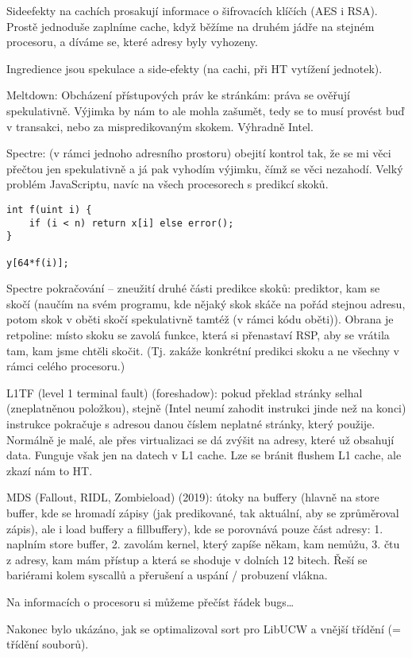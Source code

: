 \documentclass[12pt]{article}                   %
\begin{document}
        \begin{poznamka}
            Sideefekty na cachích prosakují informace o šifrovacích klíčích (AES i RSA). Prostě jednoduše zaplníme cache, když běžíme na druhém jádře na stejném procesoru, a díváme se, které adresy byly vyhozeny.

            Ingredience jsou spekulace a side-efekty (na cachi, při HT vytížení jednotek).

            Meltdown: Obcházení přístupových práv ke stránkám: práva se ověřují spekulativně. Výjimka by nám to ale mohla zašumět, tedy se to musí provést buď v transakci, nebo za mispredikovaným skokem. Výhradně Intel.


            Spectre: (v rámci jednoho adresního prostoru) obejití kontrol tak, že se mi věci přečtou jen spekulativně a já pak vyhodím výjimku, čímž se věci nezahodí. Velký problém JavaScriptu, navíc na všech procesorech s predikcí skoků.

            \begin{verbatim}
int f(uint i) {
    if (i < n) return x[i] else error();
}

y[64*f(i)];
            \end{verbatim}

            Spectre pokračování -- zneužití druhé části predikce skoků: prediktor, kam se skočí (naučím na svém programu, kde nějaký skok skáče na pořád stejnou adresu, potom skok v oběti skočí spekulativně tamtéž (v rámci kódu oběti)). Obrana je retpoline: místo skoku se zavolá funkce, která si přenastaví RSP, aby se vrátila tam, kam jsme chtěli skočit. (Tj. zakáže konkrétní predikci skoku a ne všechny v rámci celého procesoru.)

            L1TF (level 1 terminal fault) (foreshadow): pokud překlad stránky selhal (zneplatněnou položkou), stejně (Intel neumí zahodit instrukci jinde než na konci) instrukce pokračuje s adresou danou číslem neplatné stránky, který použije. Normálně je malé, ale přes virtualizaci se dá zvýšit na adresy, které už obsahují data. Funguje však jen na datech v L1 cache. Lze se bránit flushem L1 cache, ale zkazí nám to HT.

            MDS (Fallout, RIDL, Zombieload) (2019): útoky na buffery (hlavně na store buffer, kde se hromadí zápisy (jak predikované, tak aktuální, aby se zprůměroval zápis), ale i load buffery a fillbuffery), kde se porovnává pouze část adresy: 1. naplním store buffer, 2. zavolám kernel, který zapíše někam, kam nemůžu, 3. čtu z adresy, kam mám přístup a která se shoduje v dolních 12 bitech. Řeší se bariérami kolem syscallů a přerušení a uspání / probuzení vlákna.

            Na informacích o procesoru si můžeme přečíst řádek bugs…
        \end{poznamka}


        \begin{poznamka}
            Nakonec bylo ukázáno, jak se optimalizoval sort pro LibUCW a vnější třídění (= třídění souborů).
        \end{poznamka}
\end{document}
